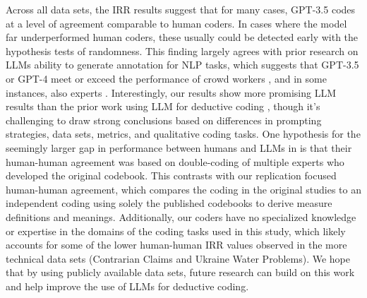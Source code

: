 \documentclass{article}
\begin{document}
Across all data sets, the IRR results suggest that for many cases, GPT-3.5 codes at a level of agreement comparable to human coders.  In cases where the model far underperformed human coders, these usually could be detected early with the hypothesis tests of randomness.  This finding largely agrees with prior research on LLMs ability to generate annotation for NLP tasks, which suggests that GPT-3.5 or GPT-4 meet or exceed the performance of crowd workers \cite{gilardi_chatgpt_2023}, and in some instances, also experts \cite{tornberg_chatgpt-4_2023}.  Interestingly, our results show more promising LLM results than the prior work using LLM for deductive coding \cite{xiao_supporting_2023}, though it’s challenging to draw strong conclusions based on differences in prompting strategies, data sets, metrics, and qualitative coding tasks. One hypothesis for the seemingly larger gap in performance between humans and LLMs in \cite{xiao_supporting_2023} is that their human-human agreement was based on double-coding of multiple experts who developed the original codebook.  This contrasts with our replication focused human-human agreement, which compares the coding in the original studies to an independent coding using solely the published codebooks to derive measure definitions and meanings. Additionally, our coders have no specialized knowledge or expertise in the domains of the coding tasks used in this study, which likely accounts for some of the lower human-human IRR values observed in the more technical data sets (Contrarian Claims and Ukraine Water Problems). We hope that by using publicly available data sets, future research can build on this work and help improve the use of LLMs for deductive coding.
\end{document}
